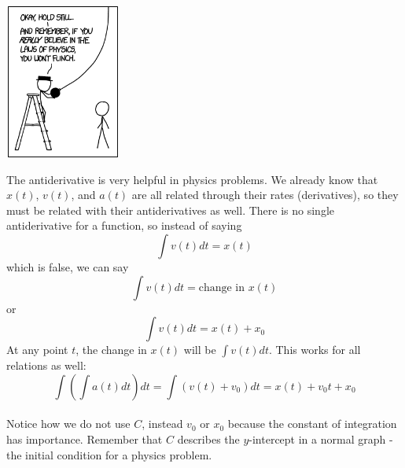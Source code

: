 \documentclass[../revisedmain.tex]{subfiles}
\begin{document}
	\vspace{.125in}
	\begin{center}
		\includegraphics[width=1.5in,height=2in]{images/physics.png}
	\end{center}
	\vspace{.25in}
The antiderivative is very helpful in physics problems. We already know that $x(t)$, $v(t)$, and $a(t)$ are all related through their rates (derivatives), so they must be related with their antiderivatives as well. There is no single antiderivative for a function, so instead of saying $$\int v(t) dt=x(t)$$ which is false, we can say$$\int v(t)dt=\text{change in }x(t)$$or$$\int v(t)dt=x(t)+x_0$$At any point $t$, the change in $x(t)$ will be $\int v(t) dt$. This works for all relations as well:$$\int\left(\int a(t) dt\right)dt=\int (v(t)+v_0)dt=x(t)+v_0t+x_0$$\\Notice how we do not use $C$, instead $v_0$ or $x_0$ because the constant of integration has importance. Remember that $C$ describes the $y$-intercept in a normal graph - the initial condition for a physics problem.\\
\end{document}
